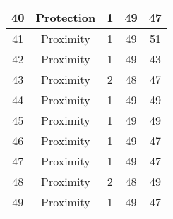 \documentclass[results.tex]{subfiles}
\begin{document}
\begin{center}
\begin{tabular}{| c || c | c | c | c |}
            \hline
            40                      & Protection                   & 1                      & 49                      & 47                   \\
            \hline
            41                      & Proximity                    & 1                      & 49                      & 51                   \\
            \hline
            42                      & Proximity                    & 1                      & 49                      & 43                   \\
            \hline
            43                      & Proximity                    & 2                      & 48                      & 47                   \\
            \hline
            44                      & Proximity                    & 1                      & 49                      & 49                   \\
            \hline
            45                      & Proximity                    & 1                      & 49                      & 49                   \\
            \hline
            46                      & Proximity                    & 1                      & 49                      & 47                   \\
            \hline
            47                      & Proximity                    & 1                      & 49                      & 47                   \\
            \hline
            48                      & Proximity                    & 2                      & 48                      & 49                   \\
            \hline
            49                      & Proximity                    & 1                      & 49                      & 47                   \\
            \hline
        \end{tabular}
    \end{center}
\end{document}
